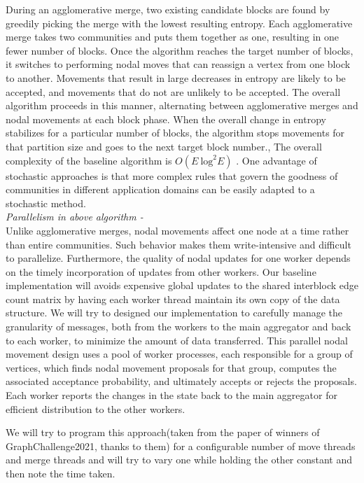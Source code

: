 \documentclass[conference]{IEEEtran}
\begin{document}
	During an agglomerative merge, two existing candidate
	blocks are found by greedily picking the merge with the
	lowest resulting entropy. Each agglomerative merge takes two
	communities and puts them together as one, resulting in one
	fewer number of blocks. Once the algorithm reaches the target
	number of blocks, it switches to performing nodal moves that
	can reassign a vertex from one block to another. Movements that result
	in large decreases in entropy are likely to be accepted, and
	movements that do not are unlikely to be accepted. The
	overall algorithm proceeds in this manner, alternating between
	agglomerative merges and nodal movements at each block
	phase. When the overall change in entropy stabilizes for a
	particular number of blocks, the algorithm stops movements
	for that partition size and goes to the next target block number.\cite{b6}, \cite{b7} The overall complexity of the baseline algorithm is
	$O(E\ \text{log}^2 E)$ \cite{b8}. One advantage of stochastic approaches is that more complex rules that govern the goodness of communities in different
application domains can be easily adapted to a stochastic
method.
\\

\textit{Parallelism in above algorithm -}\\
Unlike agglomerative merges, nodal movements affect one
node at a time rather than entire communities. Such behavior
makes them write-intensive and difficult to parallelize. Furthermore, the quality of nodal updates for one worker depends
on the timely incorporation of updates from other workers.
Our baseline implementation will avoids expensive global updates
to the shared interblock edge count matrix by having each
worker thread maintain its own copy of the data structure. We
will try to designed our implementation to carefully manage
the granularity of messages, both from the workers to the
main aggregator and back to each worker, to minimize the
amount of data transferred. This parallel nodal movement
design uses a pool of worker processes, each responsible for
a group of vertices, which finds nodal movement proposals
for that group, computes the associated acceptance probability,
and ultimately accepts or rejects the proposals. Each worker
reports the changes in the state back to the main aggregator
for efficient distribution to the other workers.

We will try to program this approach(taken from the paper of winners of GraphChallenge2021, thanks to them) for a configurable
number of move threads and merge threads and will try to vary one while holding the other constant and then note the time taken.
\\
\end{document}
